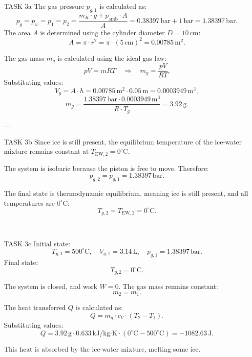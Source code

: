 TASK 3a  
The gas pressure \( p_{g,1} \) is calculated as:  
\[
p_{g} = p_{w} = p_{1} = p_{2} = \frac{m_K \cdot g + p_{\text{amb}} \cdot A}{A} = 0.38397 \, \text{bar} + 1 \, \text{bar} = 1.38397 \, \text{bar}.
\]  
The area \( A \) is determined using the cylinder diameter \( D = 10 \, \text{cm} \):  
\[
A = \pi \cdot r^2 = \pi \cdot (5 \, \text{cm})^2 = 0.00785 \, \text{m}^2.
\]  

The gas mass \( m_g \) is calculated using the ideal gas law:  
\[
pV = mRT \quad \Rightarrow \quad m_g = \frac{pV}{RT}.
\]  
Substituting values:  
\[
V_g = A \cdot h = 0.00785 \, \text{m}^2 \cdot 0.05 \, \text{m} = 0.0003949 \, \text{m}^3,
\]  
\[
m_g = \frac{1.38397 \, \text{bar} \cdot 0.0003949 \, \text{m}^3}{R \cdot T_g} = 3.92 \, \text{g}.
\]  

---

TASK 3b  
Since ice is still present, the equilibrium temperature of the ice-water mixture remains constant at \( T_{\text{EW},2} = 0^\circ\text{C} \).  

The system is isobaric because the piston is free to move. Therefore:  
\[
p_{g,2} = p_{g,1} = 1.38397 \, \text{bar}.
\]  

The final state is thermodynamic equilibrium, meaning ice is still present, and all temperatures are \( 0^\circ\text{C} \):  
\[
T_{g,2} = T_{\text{EW},2} = 0^\circ\text{C}.
\]  

---

TASK 3c  
Initial state:  
\[
T_{g,1} = 500^\circ\text{C}, \quad V_{g,1} = 3.14 \, \text{L}, \quad p_{g,1} = 1.38397 \, \text{bar}.
\]  
Final state:  
\[
T_{g,2} = 0^\circ\text{C}.
\]  

The system is closed, and work \( W = 0 \). The gas mass remains constant:  
\[
m_2 = m_1.
\]  

The heat transferred \( Q \) is calculated as:  
\[
Q = m_g \cdot c_V \cdot (T_2 - T_1).
\]  
Substituting values:  
\[
Q = 3.92 \, \text{g} \cdot 0.633 \, \text{kJ/kg·K} \cdot (0^\circ\text{C} - 500^\circ\text{C}) = -1082.63 \, \text{J}.
\]  

This heat is absorbed by the ice-water mixture, melting some ice.